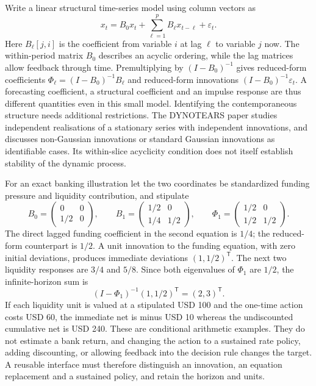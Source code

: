 Write a linear structural time-series model using column vectors as
\[
 x_t=B_0x_t+\sum_{\ell=1}^{p}B_\ell x_{t-\ell}+\varepsilon_t.
\]
Here $B_\ell[j,i]$ is the coefficient from variable $i$ at lag $\ell$ to
variable $j$ now. The within-period matrix $B_0$ describes an acyclic ordering,
while the lag matrices allow feedback through time. Premultiplying by
$(I-B_0)^{-1}$ gives reduced-form coefficients
$\Phi_\ell=(I-B_0)^{-1}B_\ell$ and reduced-form innovations
$(I-B_0)^{-1}\varepsilon_t$. A forecasting coefficient, a structural
coefficient and an impulse response are thus different quantities even in
this small model. Identifying the contemporaneous structure needs additional
restrictions. The DYNOTEARS paper studies independent realisations of a
stationary series with independent innovations, and discusses non-Gaussian
innovations or standard Gaussian innovations as identifiable cases. Its
within-slice acyclicity condition does not itself establish stability of the
dynamic process. \citep{exec14_pt_paper_dynotears}

For an exact banking illustration let the two coordinates be standardized
funding pressure and liquidity contribution, and stipulate
\[
 B_0=\begin{pmatrix}0&0\\1/2&0\end{pmatrix},\qquad
 B_1=\begin{pmatrix}1/2&0\\1/4&1/2\end{pmatrix},\qquad
 \Phi_1=\begin{pmatrix}1/2&0\\1/2&1/2\end{pmatrix}.
\]
The direct lagged funding coefficient in the second equation is $1/4$;
the reduced-form counterpart is $1/2$. A unit innovation to the funding
equation, with zero initial deviations, produces immediate deviations
$(1,1/2)^\mathsf{T}$. The next two liquidity responses are $3/4$ and $5/8$.
Since both eigenvalues of $\Phi_1$ are $1/2$, the infinite-horizon sum is
\[
 (I-\Phi_1)^{-1}(1,1/2)^\mathsf{T}=(2,3)^\mathsf{T}.
\]
If each liquidity unit is valued at a stipulated USD 100 and the one-time
action costs USD 60, the immediate net is minus USD 10 whereas the undiscounted
cumulative net is USD 240. These are conditional arithmetic examples. They
do not estimate a bank return, and changing the action to a sustained rate
policy, adding discounting, or allowing feedback into the decision rule
changes the target. A reusable interface must therefore distinguish an
innovation, an equation replacement and a sustained policy, and retain the
horizon and units. \citep{exec14_pt_exact}

